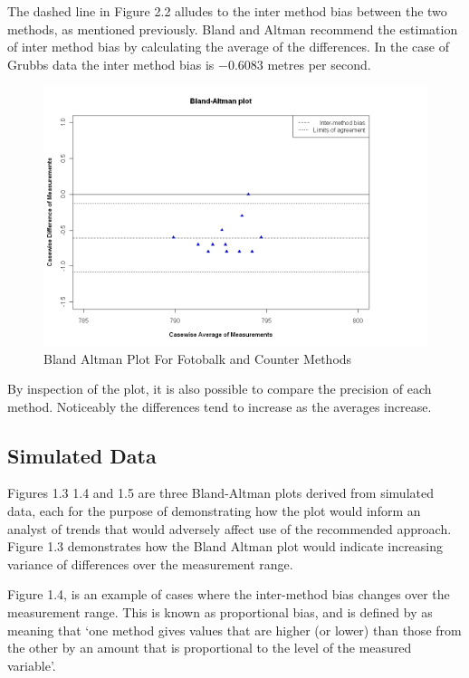 \documentclass[Main.tex]{subfiles}
\begin{document}
The dashed line in Figure 2.2 alludes to the inter method bias
	between the two methods, as mentioned previously. Bland and Altman
	recommend the estimation of inter method bias by calculating the
	average of the differences. In the case of Grubbs data the inter
	method bias is $-0.6083$ metres per second.

	\begin{figure}[h!]
		\begin{center}
			\includegraphics[width=120mm]{images/GrubbsBAplot.jpeg}
			\caption{Bland Altman Plot For Fotobalk and Counter Methods}\label{GrubbsBA}
		\end{center}
	\end{figure}

	By inspection of the plot, it is also possible to compare the precision of each method. Noticeably the differences tend to
	increase as the averages increase.
	
 	\subsection{Simulated Data}

Figures 1.3 1.4 and 1.5 are three Bland-Altman plots derived from
	simulated data, each for the purpose of demonstrating how the plot
	would inform an analyst of trends that would adversely affect use
	of the recommended approach. Figure 1.3 demonstrates how the
	Bland Altman plot would indicate increasing variance of
	differences over the measurement range. 
	
	
Figure 1.4, is an example of cases where the inter-method bias changes over the measurement range. This is known as proportional bias, and is defined by \citet{ludbrook97} as meaning that `one method gives values that are higher (or lower) than those from the other by an amount that is proportional to the level of the measured variable'.
	
\end{document}
